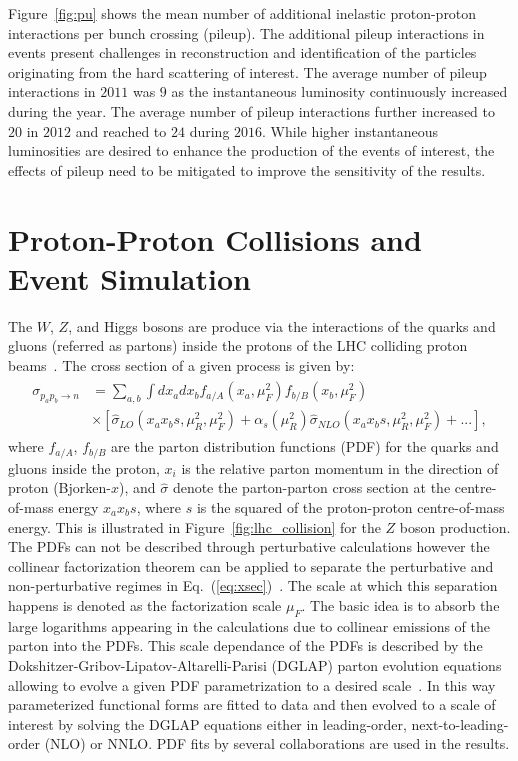 Figure~\ref{fig:pu} shows the mean number of additional inelastic proton-proton interactions per bunch crossing (pileup). The additional pileup interactions in events present challenges in reconstruction and identification of the particles originating from the hard scattering of interest. The average number of pileup interactions in $2011$ was $9$ as the instantaneous luminosity continuously increased during the year. The average number of pileup interactions further increased to $20$ in $2012$ and reached to $24$ during $2016$.  While higher instantaneous luminosities are desired to enhance the production of the events of interest, the effects of pileup need to be mitigated to improve the sensitivity of the results. 

\section{Proton-Proton Collisions and Event Simulation}

The $W$, $Z$, and Higgs bosons are produce via the interactions of the quarks and gluons (referred as partons) inside the protons of the LHC colliding proton beams~\cite{Bloom:1969kc,Breidenbach:1969kd}. The cross section of a given process is given by:
\begin{eqnarray} \label{eq:xsec}
\begin{aligned}
\sigma_{p_ap_b \rightarrow n} &= \sum_{a,b} \int dx_a dx_b f_{a/A}(x_a,\mu_{F}^2) f_{b/B}(x_{b},\mu_{F}^2)  \\ 
& \times [\hat{\sigma}_{LO}(x_ax_bs,\mu_R^2,\mu_F^2)+\alpha_s(\mu_R^2)\hat{\sigma}_{NLO}(x_ax_bs,\mu_R^2,\mu_F^2)+...],
\end{aligned}
\end{eqnarray}   
where $f_{a/A}$, $f_{b/B}$ are the parton distribution functions (PDF) for the quarks and gluons inside the proton, $x_i$ is the relative parton momentum in the direction of proton (Bjorken-$x$), and $\hat{\sigma}$ denote the parton-parton cross section at the centre-of-mass energy $x_{a}x_{b}s$, where $s$ is the squared of the proton-proton centre-of-mass energy.  This is illustrated in Figure~\ref{fig:lhc_collision} for the $Z$ boson production. The PDFs can not be described through perturbative calculations however the collinear factorization theorem can be applied to separate the perturbative and non-perturbative regimes in Eq.~(\ref{eq:xsec})~\cite{Collins:1989gx}. The scale at which this separation happens is denoted as the factorization scale $\mu_{F}$. The basic idea is to absorb the large logarithms appearing in the calculations due to collinear emissions of the parton into the PDFs. This scale dependance of the PDFs is described by the Dokshitzer-Gribov-Lipatov-Altarelli-Parisi (DGLAP) parton evolution equations allowing to evolve a given PDF parametrization to a desired scale~\cite{Gribov:1972ri,Altarelli:1977zs,Dokshitzer:1977sg}. In this way parameterized functional forms are fitted to data and then evolved to a scale of interest by solving the DGLAP equations either in leading-order, next-to-leading-order (NLO) or NNLO. PDF fits by several collaborations are used in the results.

